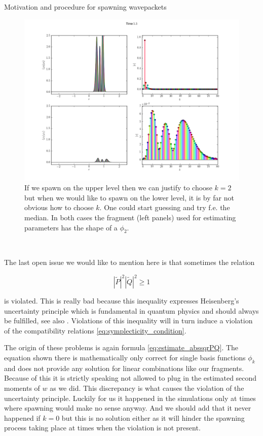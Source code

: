 \begin{chapter}{Motivation and procedure for spawning wavepackets}
\begin{figure}
  \centering
  \includegraphics[width=\linewidth]{./figures/spawn_issues_k_na.png}
  \caption[Snapshot of a $\phi_2$ wavepacket in an avoided crossing]{If we spawn
  on the upper level then we can justify to choose $k=2$ but when we would like
  to spawn on the lower level, it is by far not obvious how to choose $k$. One
  could start guessing and try f.e. the median. In both cases the fragment (left
  panels) used for estimating parameters has the shape of a $\phi_2$.}
  \label{fig:spawn_issues_k_na}
\end{figure}

~\newline

The last open issue we would like to mention here is that sometimes the relation

\begin{equation}
  |\tilde{P}|^2 |\tilde{Q}|^2 \geq 1
\end{equation}

is violated. This is really bad because this inequality expresses Heisenberg's
uncertainty principle which is fundamental in quantum physics and should always
be fulfilled, see also \cite[remark 2.7]{H_ladder_operators}. Violations of this
inequality will in turn induce a violation of the compatibility relations \eqref{eq:symplecticity_condition}.

The origin of these problems is again formula \eqref{eq:estimate_abssqrPQ}. The
equation shown there is mathematically only correct for single basis functions
$\phi_k$ and does not provide any solution for linear combinations like our
fragments. Because of this it is strictly speaking not allowed to plug in
the estimated second moments of $w$ as we did. This discrepancy is what
causes the violation of the uncertainty principle. Luckily for us it happened
in the simulations only at times where spawning would make no sense anyway.
And we should add that it never happened if $k=0$ but this is no solution either
as it will hinder the spawning process taking place at times when the
violation is not present.


\end{chapter}
